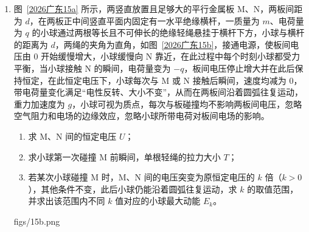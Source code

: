 \documentclass[\gkver]{gaokaozhenti}
\begin{document}
\begin{enumerate}
{设摆锤与挡板相碰前的速度为 $v$，根据机械能守恒定律有 $\frac{1}{2}mv_{0}^{2}=mgR+\frac{1}{2}mv^{2}$，

解得 $v=2\sqrt{2}\Ums$。

摆锤与挡板相碰后与机器人一起运动，根据动量守恒定律有 $2mv=Mv_{\text{共}}$，

解得 $v_{\text{共}}=\sqrt{2}\Ums$。

机器人起跳时的动能 $E_{k}=\frac{1}{2}Mv_{\text{共}}^{2}=4\UJ$。

（2）根据速度位移关系 $0-v_{\text{共}}^{2}=-2gh$，

可得机器人外壳上升的最大高度 $h=0.1\Um$。

（3）机器人外壳落到地面时，机器人外壳的速度立即变为 $0$，根据竖直上抛运动的对称性可知摆锤速度大小为 $\sqrt{2}\Ums$，从摆锤开始运动到第一次外壳落地静止过程中的机械能损失 $\Delta E=2\times\frac{1}{2}mv_{0}^{2}-\left(2\times\frac{1}{2}mv_{\text{共}}^{2}+2mgR\right)$，

解得 $\Delta E=6\UJ$。
}

\item
图~\ref{2026广东15a} 所示，两竖直放置且足够大的平行金属板 M、N，两板间距为 $d$，在两板正中间竖直平面内固定有一水平绝缘横杆，一质量为 $m$、电荷量为 $q$ 的小球通过两根等长且不可伸长的绝缘轻绳悬挂于横杆下方，小球与横杆的距离为 $d$，两绳的夹角为直角，如图~\ref{2026广东15b}，接通电源，使板间电压由 $0$ 开始缓慢增大，小球缓慢向 N 靠近，在此过程中每个时刻小球都受力平衡，当小球接触 N 的瞬间，电荷量变为 $-q$，板间电压停止增大并在此后保持恒定，在此恒定电压下，小球每次与 M 或 N 接触后瞬间，速度均减为 $0$，带电荷量变化满足“电性反转、大小不变”，从而在两板间沿着圆弧往复运动，重力加速度为 $g$，小球可视为质点，每次与板碰撞均不影响两板间电压，忽略空气阻力和电场的边缘效应，忽略小球所带电荷对板间电场的影响。
\begin{enumerate}
	\item
	求 M、N 间的恒定电压 $U$；
	\item
	求小球第一次碰撞 M 前瞬间，单根轻绳的拉力大小 $T$；
	\item
	若某次小球碰撞 M 时，M、N 间的电压突变为原恒定电压的 $k$ 倍（$k>0$），其他条件不变，此后小球仍能沿着圆弧往复运动，求 $k$ 的取值范围，并求出该范围内不同 $k$ 值对应的小球最大动能 $E_{k}$。
\end{enumerate}
{figs/15b.png}


\end{enumerate}
\end{document}
